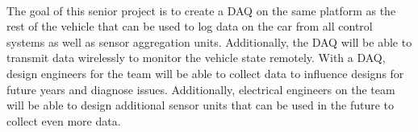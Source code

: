 \paragraph{}
The goal of this senior project is to create a DAQ on the same platform as the rest of the vehicle that can be used to log data on the car from all control systems as well as sensor aggregation units.
Additionally, the DAQ will be able to transmit data wirelessly to monitor the vehicle state remotely.
With a DAQ, design engineers for the team will be able to collect data to influence designs for future years and diagnose issues.
Additionally, electrical engineers on the team will be able to design additional sensor units that can be used in the future to collect even more data.
